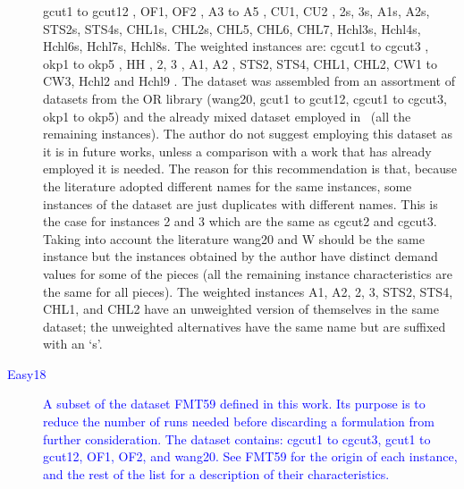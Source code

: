 \documentclass[ppgc,tese,english,formais,babel]{iiufrgs}
\newif\iffinalversion
\newcommand{\newtext}[1]{\iffinalversion%
#1%
\else%
\textcolor{blue}{#1}%
\fi%
}
\begin{document}
\begin{description}
{gcut1 to gcut12 \citep{beasley:1985:guillotine},
OF1, OF2 \citep{oliveira:1990},
A3 to A5 \citep{hifi:1997},
CU1, CU2 \citep{fayard:1998},
2s, 3s, A1s, A2s, STS2s, STS4s, CHL1s, CHL2s, CHL5, CHL6, CHL7, Hchl3s, Hchl4s, Hchl6s, Hchl7s, Hchl8s\citep{cung:2000}.
The weighted instances are:
cgcut1 to cgcut3 \citep{cw:1977},
okp1 to okp5 \citep{fekete:1997},
HH \citep{hifi:1997},
2, 3 \citep{cw:1977},
A1, A2 \citep{hifi:1997},
STS2, STS4, CHL1, CHL2, CW1 to CW3, Hchl2 and Hchl9 \citep{cung:2000}.
The dataset was assembled from an assortment of datasets from the OR library (wang20, gcut1 to gcut12, cgcut1 to cgcut3, okp1 to okp5) and the already mixed dataset employed in~\citet{hifi:2001} (all the remaining instances).
The author do not suggest employing this dataset as it is in future works, unless a comparison with a work that has already employed it is needed.
The reason for this recommendation is that, because the literature adopted different names for the same instances, some instances of the dataset are just duplicates with different names.
This is the case for instances 2 and 3 which are the same as cgcut2 and cgcut3.
Taking into account the literature wang20 and W should be the same instance but the instances obtained by the author have distinct demand values for some of the pieces (all the remaining instance characteristics are the same for all pieces).
The weighted instances A1, A2, 2, 3, STS2, STS4, CHL1, and CHL2 have an unweighted version of themselves in the same dataset; the unweighted alternatives have the same name but are suffixed with an `s'.
}
\item [\newtext{Easy18}] \newtext{A subset of the dataset FMT59 defined in this work. Its purpose is to reduce the number of runs needed before discarding a formulation from further consideration. The dataset contains: cgcut1 to cgcut3, gcut1 to gcut12, OF1, OF2, and wang20. See FMT59 for the origin of each instance, and the rest of the list for a description of their characteristics.}
\end{description}
\end{document}
